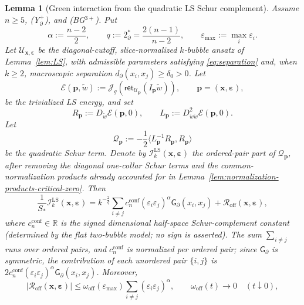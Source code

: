 \documentclass[11pt,reqno,a4paper]{amsart}
\numberwithin{equation}{section}
\theoremstyle{plain}
\newtheorem{lemma}[theorem]{Lemma}
\theoremstyle{remark}
\theoremstyle{plain}
\begin{document}
\begin{lemma}[Green interaction from the quadratic LS Schur complement]
\label{lem:offdiag-overlap-estimate}
Assume $n\ge5$, \textup{(Y$^+_{\partial}$)}, and \textup{(BG$^{3+}$)}.  Put
\[
\alpha:=\frac{n-2}{2},
\qquad
q:=2_\partial^\ast=\frac{2(n-1)}{n-2},
\qquad
\varepsilon_{\max}:=\max_i\varepsilon_i .
\]
Let $\mathcal U_{\mathbf x,\boldsymbol\varepsilon}$ be the diagonal-cutoff,
slice-normalized $k$-bubble ansatz of Lemma~\ref{lem:LS}, with admissible
parameters satisfying \eqref{eq:separation} and, when $k\ge2$, macroscopic
separation $d_\partial(x_i,x_j)\ge\delta_0>0$.  Let
\[
\mathscr E(\mathbf p,\widetilde w)
:=
\mathcal J_g\left(
\mathsf{ret}_{\mathcal U_{\mathbf p}}(I_{\mathbf p}\widetilde w)
\right),
\qquad
\mathbf p=(\mathbf x,\boldsymbol\varepsilon),
\]
be the trivialized LS energy, and set
\[
R_{\mathbf p}:=D_{\widetilde w}\mathscr E(\mathbf p,0),
\qquad
L_{\mathbf p}:=D^2_{\widetilde w\widetilde w}\mathscr E(\mathbf p,0).
\]
Let
\[
\mathscr Q_{\mathbf p}:=-\frac12
\big\langle L_{\mathbf p}^{-1}R_{\mathbf p},R_{\mathbf p}\big\rangle
\]
be the quadratic Schur term.  Denote by
$\mathscr I_k^{\mathrm{LS}}(\mathbf x,\boldsymbol\varepsilon)$ the ordered-pair
part of $\mathscr Q_{\mathbf p}$, after removing the diagonal one-collar Schur
terms and the common-normalization products already accounted for in
Lemma~\ref{lem:normalization-products-critical-zero}.  Then
\begin{equation}\label{eq:LS-Schur-Green-interaction}
\frac{1}{S_\ast}\mathscr I_k^{\mathrm{LS}}
(\mathbf x,\boldsymbol\varepsilon)
=
k^{-\frac2q}
\sum_{i\ne j}
 c_n^{\mathrm{conf}}
(\varepsilon_i\varepsilon_j)^\alpha
\mathsf G_\partial(x_i,x_j)
+
\mathcal R_{\mathrm{off}}(\mathbf x,\boldsymbol\varepsilon),
\end{equation}
where $c_n^{\mathrm{conf}}\in\mathbb R$ is the signed dimensional half-space
Schur-complement constant (determined by the flat two-bubble model; no sign is
asserted).  The sum $\sum_{i\ne j}$ runs over \emph{ordered} pairs, and
$c_n^{\mathrm{conf}}$ is normalized per ordered pair; since $\mathsf
G_\partial$ is symmetric, the contribution of each unordered pair $\{i,j\}$ is
$2c_n^{\mathrm{conf}}(\varepsilon_i\varepsilon_j)^\alpha\mathsf
G_\partial(x_i,x_j)$.  Moreover,
\begin{equation}\label{eq:LS-Schur-Green-remainder}
|\mathcal R_{\mathrm{off}}(\mathbf x,\boldsymbol\varepsilon)|
\le
\omega_{\mathrm{off}}(\varepsilon_{\max})
\sum_{i\ne j}(\varepsilon_i\varepsilon_j)^\alpha,
\qquad
\omega_{\mathrm{off}}(t)\to0
\quad(t\downarrow0),

\end{equation}
\end{lemma}
\end{document}
